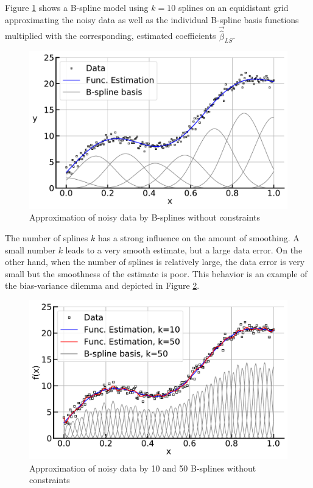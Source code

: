 \documentclass[10pt,a4paper]{article}
\begin{document}
	
	Figure \ref{fig:smooth_bf} shows a B-spline model using $k=10$ splines on an equidistant grid approximating the noisy data as well as the individual B-spline basis functions multiplied with the corresponding, estimated coefficients $\vec{\hat \beta}_{LS}$.
	
	\begin{figure}[H]
		\centering
		\includegraphics[width=\columnwidth]{../thesisplots/smooth_bf.pdf}
		\caption{Approximation of noisy data by B-splines without constraints}
		\label{fig:smooth_bf}
    \end{figure}
	
	
	The number of splines $k$ has a strong influence on the amount of smoothing. A small number $k$ leads to a very smooth estimate, but a large data error. On the other hand, when the number of splines is relatively large, the data error is very small but the smoothness of the estimate is poor. This behavior is an example of the bias-variance dilemma and depicted in Figure \ref{fig:smooth_bf_large}. \cite{sammut2011}


	\begin{figure}[H]
	\centering
	\includegraphics[width=\linewidth]{../thesisplots/smooth_wiggly_bf.pdf}
	\caption{Approximation of noisy data by 10 and 50 B-splines without constraints}
	\label{fig:smooth_bf_large}
	\end{figure}
\end{document}
